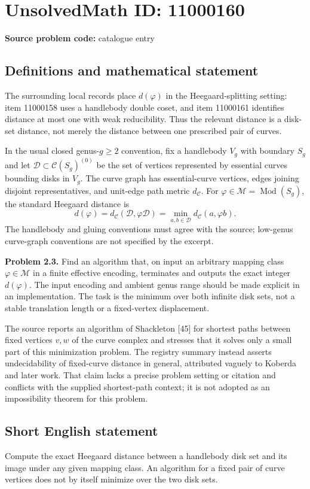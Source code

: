 \documentclass[11pt]{article}
\begin{document}
\section*{UnsolvedMath ID: 11000160}
\textbf{Source problem code:} catalogue entry
\subsection{Definitions and mathematical statement}
The surrounding local records place $d(\varphi)$ in the Heegaard-splitting setting: item 11000158 uses a handlebody double coset, and item 11000161 identifies distance at most one with weak reducibility. Thus the relevant distance is a disk-set distance, not merely the distance between one prescribed pair of curves.

In the usual closed genus-$g\ge2$ convention, fix a handlebody $V_g$ with boundary $S_g$ and let $\mathcal D\subset\mathcal C(S_g)^{(0)}$ be the set of vertices represented by essential curves bounding disks in $V_g$. The curve graph has essential-curve vertices, edges joining disjoint representatives, and unit-edge path metric $d_{\mathcal C}$. For $\varphi\in\mathcal M=\operatorname{Mod}(S_g)$, the standard Heegaard distance is
\[
 d(\varphi)=d_{\mathcal C}(\mathcal D,\varphi\mathcal D)
 =\min_{a,b\in\mathcal D}d_{\mathcal C}(a,\varphi b).
\]
The handlebody and gluing conventions must agree with the source; low-genus curve-graph conventions are not specified by the excerpt.

\textbf{Problem 2.3.} Find an algorithm that, on input an arbitrary mapping class $\varphi\in\mathcal M$ in a finite effective encoding, terminates and outputs the exact integer $d(\varphi)$. The input encoding and ambient genus range should be made explicit in an implementation. The task is the minimum over both infinite disk sets, not a stable translation length or a fixed-vertex displacement.

The source reports an algorithm of Shackleton [45] for shortest paths between fixed vertices $v,w$ of the curve complex and stresses that it solves only a small part of this minimization problem. The registry summary instead asserts undecidability of fixed-curve distance in general, attributed vaguely to Koberda and later work. That claim lacks a precise problem setting or citation and conflicts with the supplied shortest-path context; it is not adopted as an impossibility theorem for this problem.
\subsection{Short English statement}
Compute the exact Heegaard distance between a handlebody disk set and its image under any given mapping class. An algorithm for a fixed pair of curve vertices does not by itself minimize over the two disk sets.
\end{document}
